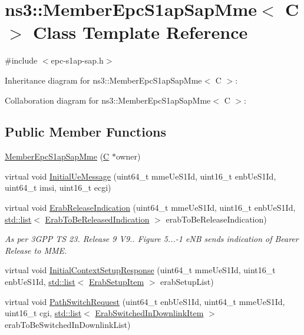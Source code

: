 \hypertarget{classns3_1_1MemberEpcS1apSapMme}{}\section{ns3\+:\+:Member\+Epc\+S1ap\+Sap\+Mme$<$ C $>$ Class Template Reference}
\label{classns3_1_1MemberEpcS1apSapMme}


{\ttfamily \#include $<$epc-\/s1ap-\/sap.\+h$>$}



Inheritance diagram for ns3\+:\+:Member\+Epc\+S1ap\+Sap\+Mme$<$ C $>$\+:


Collaboration diagram for ns3\+:\+:Member\+Epc\+S1ap\+Sap\+Mme$<$ C $>$\+:
\subsection*{Public Member Functions}
\begin{DoxyCompactItemize}
\item 
\hyperlink{classns3_1_1MemberEpcS1apSapMme_a06993c4f4eca367827516ff29fc5047c}{Member\+Epc\+S1ap\+Sap\+Mme} (\hyperlink{loss__COST231__small__cities__urban_8m_aaa53ca0b650dfd85c4f59fa156f7a2cc}{C} $\ast$owner)
\item 
virtual void \hyperlink{classns3_1_1MemberEpcS1apSapMme_a9bf1e80fae86432def2ce998297d6d3e}{Initial\+Ue\+Message} (uint64\+\_\+t mme\+Ue\+S1\+Id, uint16\+\_\+t enb\+Ue\+S1\+Id, uint64\+\_\+t imsi, uint16\+\_\+t ecgi)
\item 
virtual void \hyperlink{classns3_1_1MemberEpcS1apSapMme_ab6e2408baf83530c6217c4634a03051a}{Erab\+Release\+Indication} (uint64\+\_\+t mme\+Ue\+S1\+Id, uint16\+\_\+t enb\+Ue\+S1\+Id, \hyperlink{openflow-interface_8h_afd9bcfa176617760671b67580f536fa7}{std\+::list}$<$ \hyperlink{structns3_1_1EpcS1apSap_1_1ErabToBeReleasedIndication}{Erab\+To\+Be\+Released\+Indication} $>$ erab\+To\+Be\+Release\+Indication)
\begin{DoxyCompactList}\small\item\em As per 3\+G\+PP TS 23. Release 9 V9.. Figure 5...-\/1 e\+NB sends indication of Bearer Release to M\+ME. \end{DoxyCompactList}\item 
virtual void \hyperlink{classns3_1_1MemberEpcS1apSapMme_ad1a0d650e1bd6770159444e1af944fa0}{Initial\+Context\+Setup\+Response} (uint64\+\_\+t mme\+Ue\+S1\+Id, uint16\+\_\+t enb\+Ue\+S1\+Id, \hyperlink{openflow-interface_8h_afd9bcfa176617760671b67580f536fa7}{std\+::list}$<$ \hyperlink{structns3_1_1EpcS1apSap_1_1ErabSetupItem}{Erab\+Setup\+Item} $>$ erab\+Setup\+List)
\item 
virtual void \hyperlink{classns3_1_1MemberEpcS1apSapMme_a2f55361c5226c3a4cb0c263da6acb063}{Path\+Switch\+Request} (uint64\+\_\+t enb\+Ue\+S1\+Id, uint64\+\_\+t mme\+Ue\+S1\+Id, uint16\+\_\+t cgi, \hyperlink{openflow-interface_8h_afd9bcfa176617760671b67580f536fa7}{std\+::list}$<$ \hyperlink{structns3_1_1EpcS1apSap_1_1ErabSwitchedInDownlinkItem}{Erab\+Switched\+In\+Downlink\+Item} $>$ erab\+To\+Be\+Switched\+In\+Downlink\+List)
\end{DoxyCompactItemize}

